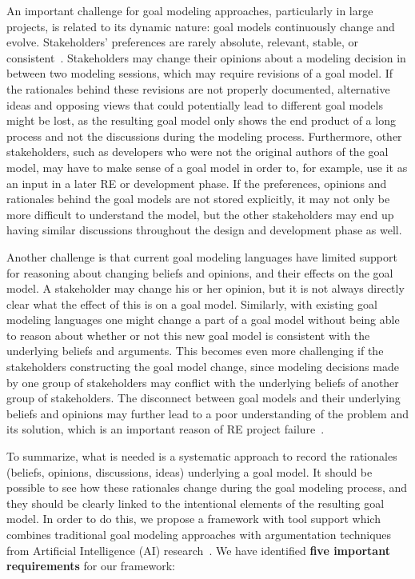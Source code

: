 An important challenge for goal modeling approaches, particularly in large projects, is related to its dynamic nature: goal models continuously change and evolve. Stakeholders' preferences are rarely absolute, relevant, stable, or consistent~\cite{march1978bounded}. Stakeholders may change their opinions about a modeling decision in between two modeling sessions, which may require revisions of a goal model. If the rationales behind these revisions are not properly documented, alternative ideas and opposing views that could potentially lead to different goal models might be lost, as the resulting goal model only shows the end product of a long process and not the discussions during the modeling process. Furthermore, other stakeholders, such as developers who were not the original authors of the goal model, may have to make sense of a goal model in order to, for example, use it as an input in a later RE or development phase. If the preferences, opinions and rationales behind the goal models are not stored explicitly, it may not only be more difficult to understand the model, but the other stakeholders may end up having similar discussions throughout the design and development phase as well.

Another challenge is that current goal modeling languages have limited support for reasoning about changing beliefs and opinions, and their effects on the goal model. A stakeholder may change his or her opinion, but it is not always directly clear what the effect of this is on a goal model. Similarly, with existing goal modeling languages one might change a part of a goal model without being able to reason about whether or not this new goal model is consistent with the underlying beliefs and arguments. This becomes even more challenging if the stakeholders constructing the goal model change, since modeling decisions made by one group of stakeholders may conflict with the underlying beliefs of another group of stakeholders. The disconnect between goal models and their underlying beliefs and opinions may further lead to a poor understanding of the problem and its solution, which is an important reason of RE project failure~\cite{curtis1988field}. 

To summarize, what is needed is a systematic approach to record the rationales (beliefs, opinions, discussions, ideas) underlying a goal model. It should be possible to see how these rationales change during the goal modeling process, and they should be clearly linked to the intentional elements of the resulting goal model. In order to do this, we propose a framework with tool support which combines traditional goal modeling approaches with argumentation techniques from Artificial Intelligence (AI) research~\cite{BenchCaponDunne2007}. We have identified \textbf{five important requirements} for our framework: 


